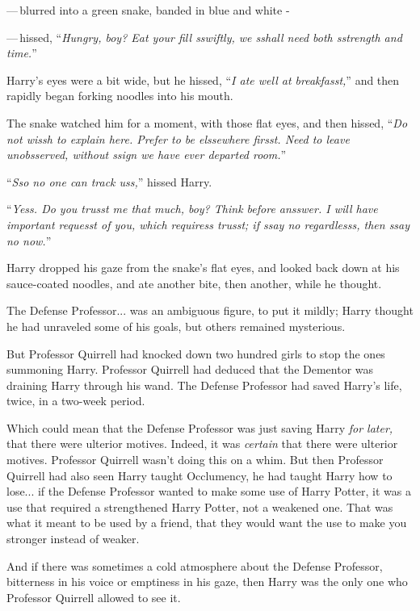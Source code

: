 ---\,blurred into a green snake, banded in blue and white -

---\,hissed, ``\emph{Hungry, boy? Eat your fill sswiftly, we sshall need both sstrength and time.}''

Harry's eyes were a bit wide, but he hissed, ``\emph{I ate well at breakfasst,}'' and then rapidly began forking noodles into his mouth.

The snake watched him for a moment, with those flat eyes, and then hissed, ``\emph{Do not wissh to explain here. Prefer to be elssewhere firsst. Need to leave unobsserved, without ssign we have ever departed room.}''

``\emph{Sso no one can track uss,}'' hissed Harry.

``\emph{Yess. Do you trusst me that much, boy? Think before ansswer. I will have important requesst of you, which requiress trusst; if ssay no regardlesss, then ssay no now.}''

Harry dropped his gaze from the snake's flat eyes, and looked back down at his sauce-coated noodles, and ate another bite, then another, while he thought.

The Defense Professor... was an ambiguous figure, to put it mildly; Harry thought he had unraveled some of his goals, but others remained mysterious.

But Professor Quirrell had knocked down two hundred girls to stop the ones summoning Harry. Professor Quirrell had deduced that the Dementor was draining Harry through his wand. The Defense Professor had saved Harry's life, twice, in a two-week period.

Which could mean that the Defense Professor was just saving Harry \emph{for later,} that there were ulterior motives. Indeed, it was \emph{certain} that there were ulterior motives. Professor Quirrell wasn't doing this on a whim. But then Professor Quirrell had also seen Harry taught Occlumency, he had taught Harry how to lose... if the Defense Professor wanted to make some use of Harry Potter, it was a use that required a strengthened Harry Potter, not a weakened one. That was what it meant to be used by a friend, that they would want the use to make you stronger instead of weaker.

And if there was sometimes a cold atmosphere about the Defense Professor, bitterness in his voice or emptiness in his gaze, then Harry was the only one who Professor Quirrell allowed to see it.

